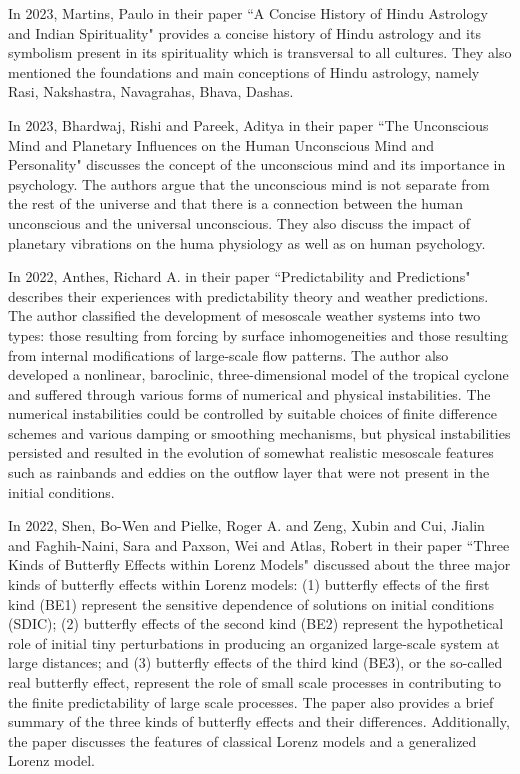 In 2023, Martins, Paulo in their paper ``A Concise History of Hindu Astrology and Indian Spirituality" provides a concise history of Hindu astrology and its symbolism present in its spirituality which is transversal to all cultures. They also mentioned the foundations and main conceptions of Hindu astrology, namely Rasi, Nakshastra, Navagrahas, Bhava, Dashas\cite{article2}.

In 2023, Bhardwaj, Rishi and Pareek, Aditya in their paper ``The Unconscious Mind and Planetary Influences on the Human Unconscious Mind and Personality" discusses the concept of the unconscious mind and its importance in psychology. The authors argue that the unconscious mind is not separate from the rest of the universe and that there is a connection between the human unconscious and the universal unconscious. They also discuss the impact of planetary vibrations on the huma physiology as well as on human psychology\cite{article1}.

In 2022, Anthes, Richard A. in their paper ``Predictability and Predictions" describes their experiences with predictability theory and weather predictions. The author classified the development of mesoscale weather systems into two types: those resulting from forcing by surface inhomogeneities and those resulting from internal modifications of large-scale flow patterns. The author also developed a nonlinear, baroclinic, three-dimensional model of the tropical cyclone and suffered through various forms of numerical and physical instabilities. The numerical instabilities could be controlled by suitable choices of finite difference schemes and various damping or smoothing mechanisms, but physical instabilities persisted and resulted in the evolution of somewhat realistic mesoscale features such as rainbands and eddies on the outflow layer that were not present in the initial conditions\cite{atmos13081292}.

In 2022, Shen, Bo-Wen and Pielke, Roger A. and Zeng, Xubin and Cui, Jialin and Faghih-Naini, Sara and Paxson, Wei and Atlas, Robert in their paper ``Three Kinds of Butterfly Effects within Lorenz Models" discussed about the three major kinds of butterfly effects within Lorenz models: (1) butterfly effects of the first kind (BE1) represent the sensitive dependence of solutions on initial conditions (SDIC); (2) butterfly effects of the second kind (BE2) represent the hypothetical role of initial tiny perturbations in producing an organized large-scale system at large distances; and (3) butterfly effects of the third kind (BE3), or the so-called real butterfly effect, represent the role of small scale processes in contributing to the finite predictability of large scale processes. The paper also provides a brief summary of the three kinds of butterfly effects and their differences. Additionally, the paper discusses the features of classical Lorenz models and a generalized Lorenz model\cite{encyclopedia2030084}.

